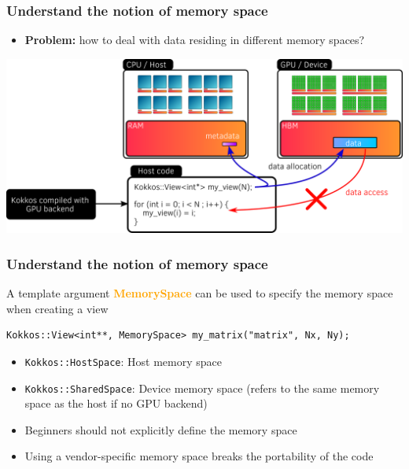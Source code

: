 \documentclass[aspectratio=169]{beamer}
\newcommand{\highlight}[1]{\textcolor{orange}{\textbf{#1}}}
\begin{document}
\begin{frame}[fragile]
    \frametitle{Understand the notion of memory space}

\begin{itemize}
    \item \textbf{Problem:} how to deal with data residing in different memory spaces?
\end{itemize}

\begin{center}
    \includegraphics[width=\textwidth]{../../images/device_memory_access.png}
\end{center}

\end{frame}


\begin{frame}[fragile]
    \frametitle{Understand the notion of memory space}

A template argument \highlight{MemorySpace} can be used to specify the memory space when creating a view

\begin{verbatim}
Kokkos::View<int**, MemorySpace> my_matrix("matrix", Nx, Ny);
\end{verbatim}

\begin{itemize}
    \item \texttt{Kokkos::HostSpace}: Host memory space
    \item \texttt{Kokkos::SharedSpace}: Device memory space (refers to the same memory space as the host if no GPU backend)
\end{itemize}

\begin{alertblock}{}
    \begin{itemize}
    \item Beginners should not explicitly define the memory space
    \item Using a vendor-specific memory space breaks the portability of the code
    \end{itemize}
\end{alertblock}

\end{frame}
\end{document}
